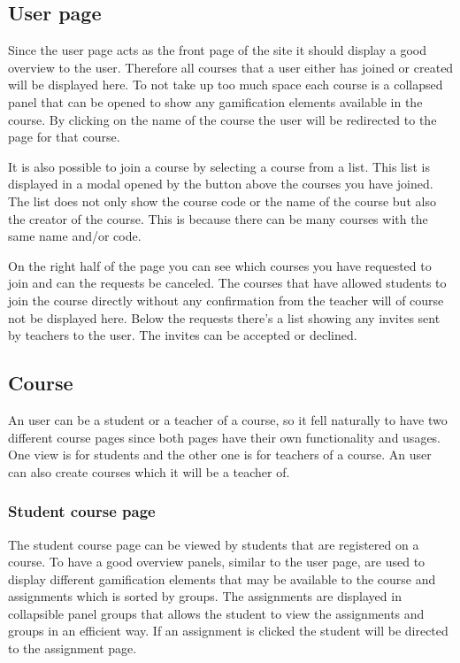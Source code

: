 \subsection{User page}
Since the user page acts as the front page of the site it should display a good overview to the user. Therefore all courses that a user either has joined or created will be displayed here. To not take up too much space each course is a collapsed panel that can be opened to show any gamification elements available in the course. By clicking on the name of the course the user will be redirected to the page for that course.

It is also possible to join a course by selecting a course from a list. This list is displayed in a modal opened by the button above the courses you have joined.  The list does not only show the course code or the name of the course but also the creator of the course. This is because there can be many courses with the same name and/or code.

On the right half of the page you can see which courses you have requested to join and can the requests be canceled. The courses that have allowed students to join the course directly without any confirmation from the teacher will of course not be displayed here. Below the requests there's a list showing any invites sent by teachers to the user. The invites can be accepted or declined.

\subsection{Course}
An user can be a student or a teacher of a course, so it fell naturally to have two different course pages since both pages have their own functionality and usages. One view is for students and the other one is for teachers of a course. An user can also create courses which it will be a teacher of. 
\subsubsection{Student course page}
The student course page can be viewed by students that are registered on a course. To have a good overview panels, similar to the user page, are used to display different gamification elements that may be available to the course and assignments which is sorted by groups. The assignments are displayed in collapsible panel groups that allows the student to view the assignments and groups in an efficient way. If an assignment is clicked the student will be directed to the assignment page. 

